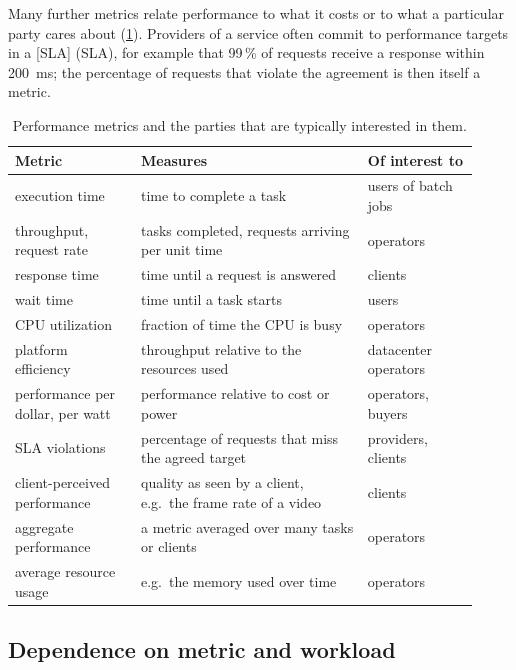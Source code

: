 \documentclass[../main.tex]{subfiles}
\begin{document}
Many further metrics relate performance to what it costs or to what a
particular party cares about (\cref{tab:l06-metrics}).  Providers of a
service often commit to performance targets in a
[SLA]
(SLA), for example that 99\,\% of requests receive a response within
\SI{200}{\milli\second}; the percentage of requests that violate the
agreement is then itself a metric.

\begin{table}[htbp]
  \centering
  \caption{Performance metrics and the parties that are typically
    interested in them.}
  \label{tab:l06-metrics}
  \small
  \begin{tabular}{@{}>{\raggedright\arraybackslash}p{0.25\linewidth}>{\raggedright\arraybackslash}p{0.45\linewidth}>{\raggedright\arraybackslash}p{0.22\linewidth}@{}}
    \toprule
    Metric & Measures & Of interest to \\
    \midrule
    execution time & time to complete a task & users of batch jobs \\
    throughput, request rate & tasks completed, requests arriving per unit
      time & operators \\
    response time & time until a request is answered & clients \\
    wait time & time until a task starts & users \\
    CPU utilization & fraction of time the CPU is busy & operators \\
    platform efficiency & throughput relative to the resources used &
      datacenter operators \\
    performance per dollar, per watt & performance relative to cost or power
      & operators, buyers \\
    SLA violations & percentage of requests that miss the agreed target &
      providers, clients \\
    client-perceived performance & quality as seen by a client, e.g.\ the
      frame rate of a video & clients \\
    aggregate performance & a metric averaged over many tasks or clients &
      operators \\
    average resource usage & e.g.\ the memory used over time & operators \\
    \bottomrule
  \end{tabular}
\end{table}

\subsection{Dependence on metric and workload}
\end{document}
